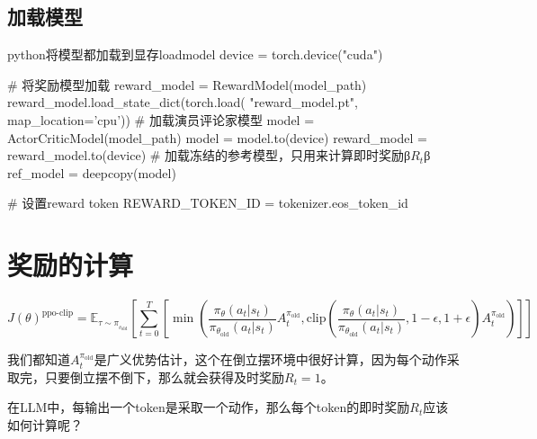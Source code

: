\documentclass[lang=cn,newtx,10pt,scheme=chinese]{elegantbook}
\begin{document}
\subsection{加载模型}

\begin{codebox}{python}{将模型都加载到显存}{loadmodel}
device = torch.device("cuda")

# 将奖励模型加载
reward_model = RewardModel(model_path)
reward_model.load_state_dict(torch.load(
    "reward_model.pt",
    map_location='cpu'))
# 加载演员评论家模型
model = ActorCriticModel(model_path)
model = model.to(device)
reward_model = reward_model.to(device)
# 加载冻结的参考模型，只用来计算即时奖励β$R_t$β
ref_model = deepcopy(model)

# 设置reward token
REWARD_TOKEN_ID = tokenizer.eos_token_id
\end{codebox}

\section{奖励的计算}

\begin{equation}
J(\theta)^{\text{ppo-clip}}=\mathbb{E}_{\tau\sim\pi_{{_\theta}_{\text{old}}}}\left[{\sum_{t=0}^T\left[\min\left(\frac{\pi_\theta(a_t|s_t)}{\pi_{\theta_{\text{old}}}(a_t|s_t)}A_t^{\pi_{\text{old}}},\text{clip}\left(\frac{\pi_\theta(a_t|s_t)}{\pi_{\theta_{\text{old}}}(a_t|s_t)},1-\epsilon,1+\epsilon\right)A_t^{\pi_{\text{old}}}\right)\right]}\right]
\end{equation}

我们都知道$A_t^{\pi_{\text{old}}}$是广义优势估计，这个在倒立摆环境中很好计算，因为每个动作采取完，只要倒立摆不倒下，那么就会获得及时奖励$R_t=1$。

\begin{marker}
在LLM中，每输出一个token是采取一个动作，那么每个token的即时奖励$R_t$应该如何计算呢？
\end{marker}

\begin{table}
    \centering
    \caption{提示词为``这本书''，补全为``真好看''的$R_t$的计算}\label{tbl:calrtfortoken}
\end{table}
\end{document}
